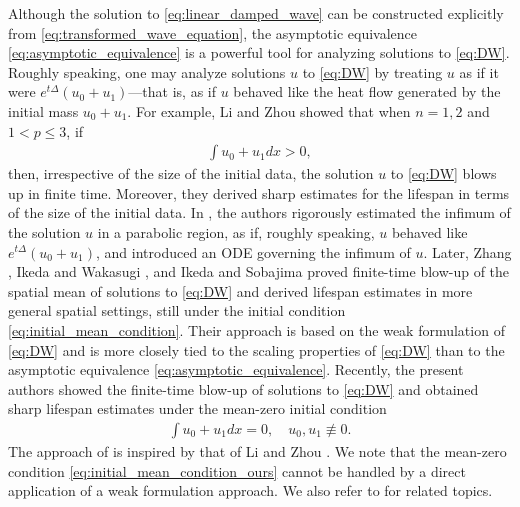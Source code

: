 \documentclass[reqno]{amsart}
\begin{document}
Although the solution to \eqref{eq:linear_damped_wave}
can be constructed explicitly from \eqref{eq:transformed_wave_equation},
the asymptotic equivalence \eqref{eq:asymptotic_equivalence}
is a powerful tool for analyzing solutions to \eqref{eq:DW}.
Roughly speaking, one may analyze solutions $u$ to \eqref{eq:DW}
by treating $u$ as if it were $e^{t \Delta}(u_0 + u_1)$—that is,
as if $u$ behaved like the heat flow generated by the initial mass $u_0+u_1$.
For example, Li and Zhou \cite{LZ95} showed that
when $n = 1, 2$ and $1 < p \leq 3$,
if
	\begin{align}
	\int u_0 + u_1 dx > 0,
	\label{eq:initial_mean_condition}
	\end{align}
then, irrespective of the size of the initial data,
the solution $u$ to \eqref{eq:DW} blows up in finite time.
Moreover, they derived sharp estimates for the lifespan in terms of the size of the initial data.
In \cite{LZ95}, the authors rigorously estimated the infimum of the solution $u$ in a parabolic region,
as if, roughly speaking, $u$ behaved like $e^{t \Delta} (u_0 + u_1)$,
and introduced an ODE governing the infimum of $u$.
Later,
Zhang \cite{Z01},
Ikeda and Wakasugi \cite{IW15},
and Ikeda and Sobajima \cite{IS19}
proved finite-time blow-up of
the spatial mean of solutions to \eqref{eq:DW}
and derived lifespan estimates
in more general spatial settings,
still under the initial condition \eqref{eq:initial_mean_condition}.
Their approach is based on the weak formulation of \eqref{eq:DW}
and is more closely tied to the scaling properties of \eqref{eq:DW}
than to the asymptotic equivalence \eqref{eq:asymptotic_equivalence}.
Recently, the present authors \cite{FG25a}
showed the finite-time blow-up of solutions to \eqref{eq:DW}
and obtained sharp lifespan estimates
under the mean-zero initial condition
	\begin{align}
	\int u_0 + u_1 dx = 0,
	\quad
	u_0, u_1 \not\equiv 0.
	\label{eq:initial_mean_condition_ours}
	\end{align}
The approach of \cite{FG25a} is inspired by that of Li and Zhou \cite{LZ95}.
We note that
the mean-zero condition \eqref{eq:initial_mean_condition_ours}
cannot be handled by a direct application of a weak formulation approach.
We also refer to \cite{IO16, FIW19, IS19} for related topics.
\end{document}
